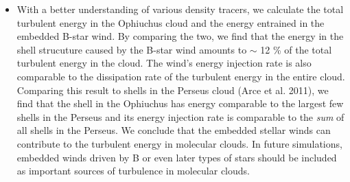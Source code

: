 \documentclass[11pt,a4paper]{emulateapj}
\begin{document}
\begin{itemize}
\item With a better understanding of various density tracers, we calculate the total turbulent energy in the Ophiuchus cloud and the energy entrained in the embedded B-star wind. By comparing the two, we find that the energy in the shell strucuture caused by the B-star wind amounts to $\sim$ 12 \% of the total turbulent energy in the cloud. The wind's energy injection rate is also comparable to the dissipation rate of the turbulent energy in the entire cloud. Comparing this result to shells in the Perseus cloud (Arce et al. 2011), we find that the shell in the Ophiuchus has energy comparable to the largest few shells in the Perseus and its energy injection rate is comparable to the \emph{sum} of all shells in the Perseus. We conclude that the embedded stellar winds can contribute to the turbulent energy in molecular clouds. In future simulations, embedded winds driven by B or even later types of stars should be included as important sources of turbulence in molecular clouds.
\end{itemize}



%



\end{document}
